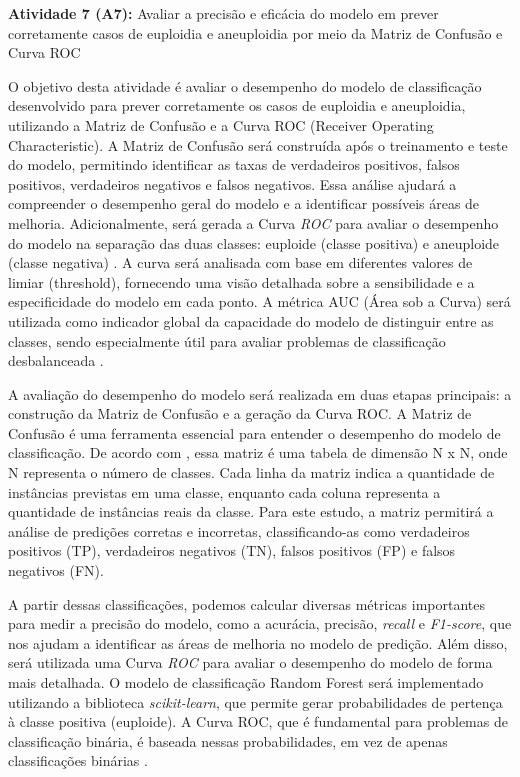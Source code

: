 \textbf{Atividade 7 (A7):} Avaliar a precisão e eficácia do modelo em prever corretamente casos de euploidia e aneuploidia  por meio da Matriz de Confusão e Curva ROC

O objetivo desta atividade é avaliar o desempenho do modelo de classificação desenvolvido para prever corretamente os casos de euploidia e aneuploidia, utilizando a Matriz de Confusão e a Curva ROC (Receiver Operating Characteristic). A Matriz de Confusão será construída após o treinamento e teste do modelo, permitindo identificar as taxas de verdadeiros positivos, falsos positivos, verdadeiros negativos e falsos negativos. Essa análise ajudará a compreender o desempenho geral do modelo e a identificar possíveis áreas de melhoria. Adicionalmente, será gerada a Curva \textit{ROC} para avaliar o desempenho do modelo na separação das duas classes: euploide (classe positiva) e aneuploide (classe negativa) \cite{vilela2022}. A curva será analisada com base em diferentes valores de limiar (threshold), fornecendo uma visão detalhada sobre a sensibilidade e a especificidade do modelo em cada ponto. A métrica AUC (Área sob a Curva) será utilizada como indicador global da capacidade do modelo de distinguir entre as classes, sendo especialmente útil para avaliar problemas de classificação desbalanceada \cite{vilela2022}.

A avaliação do desempenho do modelo será realizada em duas etapas principais: a construção da Matriz de Confusão e a geração da Curva ROC. A Matriz de Confusão é uma ferramenta essencial para entender o desempenho do modelo de classificação. De acordo com , essa matriz é uma tabela de dimensão N x N, onde N representa o número de classes. Cada linha da matriz indica a quantidade de instâncias previstas em uma classe, enquanto cada coluna representa a quantidade de instâncias reais da classe. Para este estudo, a matriz permitirá a análise de predições corretas e incorretas, classificando-as como verdadeiros positivos (TP), verdadeiros negativos (TN), falsos positivos (FP) e falsos negativos (FN). 

A partir dessas classificações, podemos calcular diversas métricas importantes para medir a precisão do modelo, como a acurácia, precisão, \textit{recall} e \textit{F1-score}, que nos ajudam a identificar as áreas de melhoria no modelo de predição. Além disso, será utilizada uma Curva \textit{ROC} para avaliar o desempenho do modelo de forma mais detalhada. O modelo de classificação Random Forest será implementado utilizando a biblioteca \textit{scikit-learn}, que permite gerar probabilidades de pertença à classe positiva (euploide). A Curva ROC, que é fundamental para problemas de classificação binária, é baseada nessas probabilidades, em vez de apenas classificações binárias \cite{vilela2022}. 


